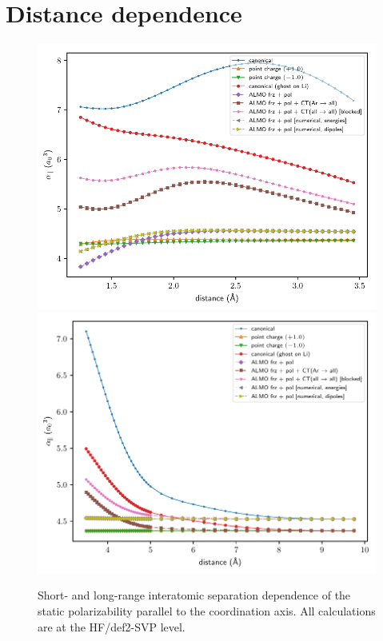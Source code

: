 \section{Distance dependence}

\begin{figure}
  \includegraphics[scale=1.00]{paper_04/polar_onaxis_projected_short_def2-SVP.pdf}
  \includegraphics[scale=1.00]{paper_04/polar_onaxis_projected_long_def2-SVP.pdf}
  \caption{Short- and long-range interatomic separation dependence of the static polarizability parallel to the coordination axis. All calculations are at the HF/def2-SVP level.}
  \label{fig:distance-dependence-parallel-def2-svp}
\end{figure}

